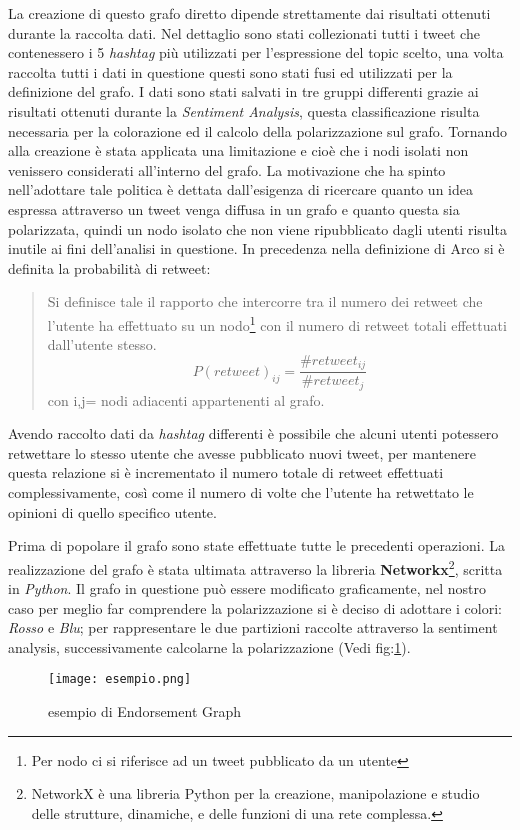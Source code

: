 La creazione di questo grafo diretto dipende strettamente dai risultati ottenuti durante la raccolta dati. Nel dettaglio sono stati collezionati tutti i tweet che contenessero i 5 \textit{hashtag} più utilizzati per l'espressione del topic scelto, una volta raccolta tutti i dati in questione questi sono stati fusi ed utilizzati per la definizione del grafo. I dati sono stati salvati in tre gruppi differenti grazie ai risultati ottenuti durante la \textit{Sentiment Analysis}, questa classificazione risulta necessaria per la colorazione ed il calcolo della polarizzazione sul grafo. Tornando alla creazione è stata applicata una limitazione e cioè che i nodi isolati non venissero considerati all'interno del grafo. La motivazione che ha spinto nell'adottare tale politica è dettata dall'esigenza di ricercare quanto un idea espressa attraverso un tweet venga diffusa in un grafo e quanto questa sia polarizzata, quindi un nodo isolato che non viene ripubblicato dagli utenti risulta inutile ai fini dell'analisi in questione.
In precedenza nella definizione di Arco si è definita la probabilità di retweet:
\begin{quote}
Si definisce tale il rapporto che intercorre tra il numero dei retweet che l'utente ha effettuato su un nodo\footnote{Per nodo ci si riferisce ad un tweet pubblicato da un utente} con il numero di retweet totali effettuati dall'utente stesso.
\begin{equation}
 P(retweet)_{ij} = \dfrac{\#retweet_{ij}}{\#retweet_{j}} 
\end{equation}
 con i,j= nodi adiacenti appartenenti al grafo.
 \end{quote}
 Avendo raccolto dati da \textit{hashtag} differenti è possibile che alcuni utenti potessero retwettare lo stesso utente che avesse pubblicato nuovi tweet, per mantenere questa relazione si è incrementato il numero totale di retweet effettuati complessivamente, così come il numero di volte che l'utente ha retwettato le opinioni di quello specifico utente. 

Prima di popolare il grafo sono state effettuate tutte le precedenti operazioni. La realizzazione del grafo è stata ultimata attraverso la libreria \textbf{Networkx}\footnote{NetworkX è una libreria Python per la creazione, manipolazione e studio delle strutture, dinamiche, e delle funzioni di una rete complessa.}, scritta in \textit{Python}.
Il grafo in questione può essere modificato graficamente, nel nostro caso per meglio far comprendere la polarizzazione si è deciso di adottare i colori: 	\textit{Rosso} e \textit{Blu}; per rappresentare le due partizioni raccolte attraverso la sentiment analysis, successivamente calcolarne la polarizzazione (Vedi fig:\ref{endorsement}).
\begin{figure}[!h]
    \begin{center}
      \texttt{[image: esempio.png]}
		\caption{esempio di Endorsement Graph}
	\label{endorsement}
    \end{center}
  \end{figure}
\newpage
